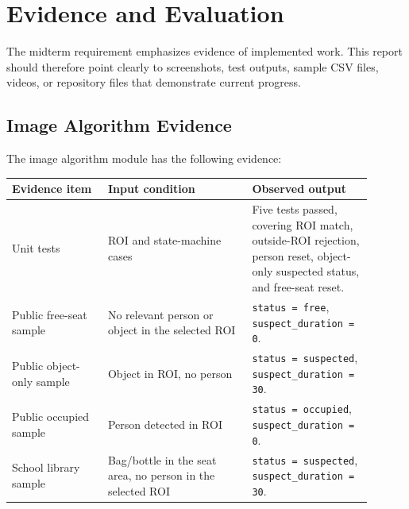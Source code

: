 \section{Evidence and Evaluation}

The midterm requirement emphasizes evidence of implemented work. This report should therefore point clearly to screenshots, test outputs, sample CSV files, videos, or repository files that demonstrate current progress.



\subsection{Image Algorithm Evidence}

The image algorithm module has the following evidence:

\begin{longtable}{|p{0.24\linewidth}|p{0.36\linewidth}|p{0.30\linewidth}|}
\hline
\textbf{Evidence item} & \textbf{Input condition} & \textbf{Observed output} \\
\hline
Unit tests & ROI and state-machine cases & Five tests passed, covering ROI match, outside-ROI rejection, person reset, object-only suspected status, and free-seat reset. \\
\hline
Public free-seat sample & No relevant person or object in the selected ROI & \texttt{status = free}, \texttt{suspect\_duration = 0}. \\
\hline
Public object-only sample & Object in ROI, no person & \texttt{status = suspected}, \texttt{suspect\_duration = 30}. \\
\hline
Public occupied sample & Person detected in ROI & \texttt{status = occupied}, \texttt{suspect\_duration = 0}. \\
\hline
School library sample & Bag/bottle in the seat area, no person in the selected ROI & \texttt{status = suspected}, \texttt{suspect\_duration = 30}. \\
\hline
\end{longtable}

